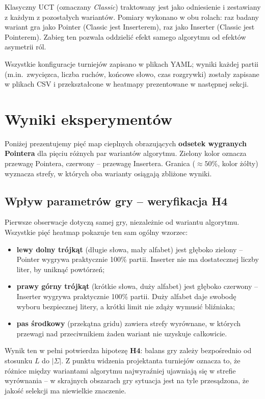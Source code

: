 \documentclass{article}
\begin{document}
Klasyczny UCT (oznaczany \emph{Classic}) traktowany jest jako odniesienie
i zestawiany z każdym z pozostałych wariantów. Pomiary wykonano w obu
rolach: raz badany wariant gra jako Pointer (Classic jest Inserterem),
raz jako Inserter (Classic jest Pointerem). Zabieg ten pozwala oddzielić
efekt samego algorytmu od efektów asymetrii ról.

Wszystkie konfiguracje turniejów zapisano w plikach YAML; wyniki każdej
partii (m.in.\ zwycięzca, liczba ruchów, końcowe słowo, czas rozgrywki)
zostały zapisane w plikach CSV i przekształcone w heatmapy prezentowane
w następnej sekcji.

\section{Wyniki eksperymentów}

Poniżej prezentujemy pięć map cieplnych obrazujących \textbf{odsetek
wygranych Pointera} dla pięciu różnych par wariantów algorytmu.
Zielony kolor oznacza przewagę Pointera, czerwony -- przewagę Insertera.
Granica ($\approx 50\%$, kolor żółty) wyznacza strefy, w których oba
warianty osiągają zbliżone wyniki.

\subsection{Wpływ parametrów gry -- weryfikacja H4}

Pierwsze obserwacje dotyczą samej gry, niezależnie od wariantu algorytmu.
Wszystkie pięć heatmap pokazuje ten sam ogólny wzorzec:
\begin{itemize}
    \item \textbf{lewy dolny trójkąt} (długie słowa, mały alfabet) jest
    głęboko zielony -- Pointer wygrywa praktycznie 100\% partii. Inserter
    nie ma dostatecznej liczby liter, by uniknąć powtórzeń;
    \item \textbf{prawy górny trójkąt} (krótkie słowa, duży alfabet) jest
    głęboko czerwony -- Inserter wygrywa praktycznie 100\% partii. Duży
    alfabet daje swobodę wyboru bezpiecznej litery, a krótki limit nie
    zdąży wymusić bliźniaka;
    \item \textbf{pas środkowy} (przekątna gridu) zawiera strefy
    wyrównane, w których przewagi nad przeciwnikiem żaden wariant nie
    uzyskuje całkowicie.
\end{itemize}

Wynik ten w pełni potwierdza hipotezę \textbf{H4}: balans gry zależy
bezpośrednio od stosunku $L$ do $|\Sigma|$. Z punktu widzenia projektanta
turniejów oznacza to, że różnice między wariantami algorytmu najwyraźniej
ujawniają się w strefie wyrównania -- w skrajnych obszarach gry sytuacja
jest na tyle przesądzona, że jakość selekcji ma niewielkie znaczenie.
\end{document}
